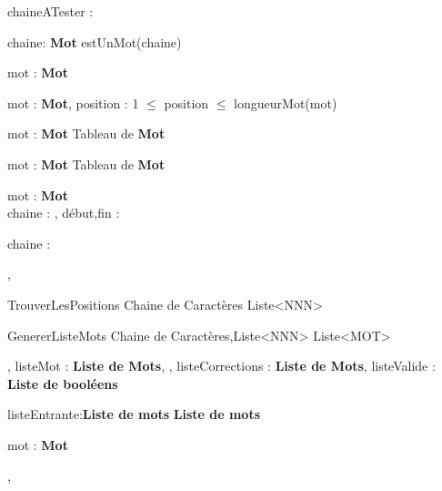 \documentclass[rapport.tex]{subfiles}
\begin{document}
	
\begin{algorithme}
	
	{chaineATester : \chaine}
	{\booleen}	
	
	{chaine:\chaine}	
	{\textbf{Mot}}
	{{estUnMot(chaine)}}
	
	{mot : \textbf{Mot}}
	{\naturelNonNul}

	{{mot : \textbf{Mot}},{ position : \naturelNonNul}}
	{\caractere}
	{1 $\leq$ position $\leq$ longueurMot(mot)}
	
	{mot : \textbf{Mot}}
	{Tableau de \textbf{Mot}}
	
	{mot : \textbf{Mot}}
	{Tableau de \textbf{Mot}}	

	{mot : \textbf{Mot}}
	{\chaine}
\\
	{chaine : \chaine, début,fin : \naturel}
	{\chaine}
	
	{chaine : \chaine}
	{\naturel}

	{, 
	}

	\signaturefonction
	{TrouverLesPositions}
	{Chaine de Caractères}
	{Liste<NNN>}
	
	\signaturefonction
	{GenererListeMots}
	{Chaine de Caractères,Liste<NNN>}
	{Liste<MOT>}
	
	{{, listeMot :\textbf{ Liste de Mots}}, 
	{, {listeCorrections : \textbf{ Liste de Mots}},
	{listeValide : \textbf{Liste de booléens}}}}

	{listeEntrante:\textbf{Liste de mots}}
	{\textbf{Liste de mots}}

	{mot : \textbf{Mot}}
	{\booleen}

	{{},
	{}}
	
		
	
\end{algorithme}
\end{document}
